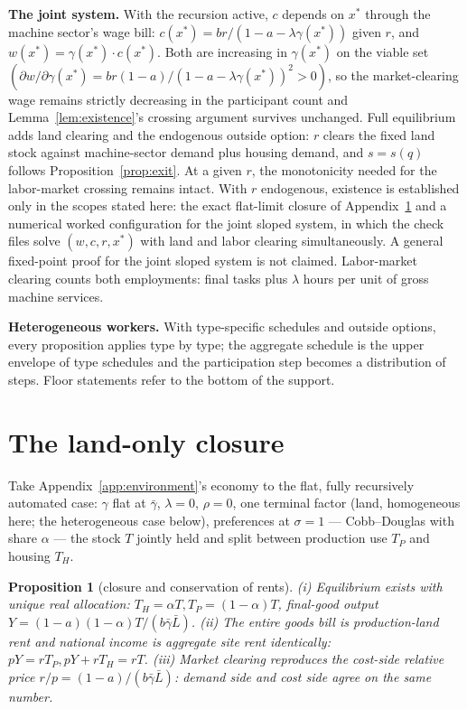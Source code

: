 \documentclass[12pt]{article}
\theoremstyle{plain}
\newtheorem{proposition}{Proposition}
\begin{document}
\textbf{The joint system.} With the recursion active, $c$ depends on $x^*$ through the machine sector's wage bill: $c(x^*) = br/(1 - a - \lambda \gamma (x^*))$ given $r$, and $w(x^*) = \gamma (x^*)\cdot c(x^*)$. Both are increasing in $\gamma (x^*)$ on the viable set $(\partial w/\partial \gamma (x^*) = br(1-a)/(1-a-\lambda \gamma (x^*))^2 > 0)$, so the market-clearing wage remains strictly decreasing in the participant count and Lemma~\ref{lem:existence}'s crossing argument survives unchanged. Full equilibrium adds land clearing and the endogenous outside option: $r$ clears the fixed land stock against machine-sector demand plus housing demand, and $s=s(q)$ follows Proposition~\ref{prop:exit}. At a given $r$, the monotonicity needed for the labor-market crossing remains intact. With $r$ endogenous, existence is established only in the scopes stated here: the exact flat-limit closure of Appendix~\ref{app:landonly} and a numerical worked configuration for the joint sloped system, in which the check files solve $(w,c,r,x^*)$ with land and labor clearing simultaneously. A general fixed-point proof for the joint sloped system is not claimed. Labor-market clearing counts both employments: final tasks plus $\lambda$ hours per unit of gross machine services.

\textbf{Heterogeneous workers.} With type-specific schedules and outside options, every proposition applies type by type; the aggregate schedule is the upper envelope of type schedules and the participation step becomes a distribution of steps. Floor statements refer to the bottom of the support.

\section{The land-only closure}\label{app:landonly}

Take Appendix~\ref{app:environment}'s economy to the flat, fully recursively automated case: $\gamma$ flat at $\bar{\gamma}$, $\lambda=0$, $\rho=0$, one terminal factor (land, homogeneous here; the heterogeneous case below), preferences at $\sigma = 1$ --- Cobb--Douglas with share $\alpha$ --- the stock $T$ jointly held and split between production use $T_P$ and housing $T_H$.

\begin{proposition}[closure and conservation of rents]\label{prop:landonly}
(i) Equilibrium exists with unique real allocation: $T_H = \alpha T, T_P = (1-\alpha )T$, final-good output $Y = (1-a)(1-\alpha )T/(b\bar{\gamma}\bar{L})$. (ii) The entire goods bill is production-land rent and national income is aggregate site rent identically: $pY = rT_P, pY + rT_H = rT$. (iii) Market clearing reproduces the cost-side relative price $r/p = (1-a)/(b\bar{\gamma}\bar{L})$: demand side and cost side agree on the same number.
\end{proposition}
\end{document}
